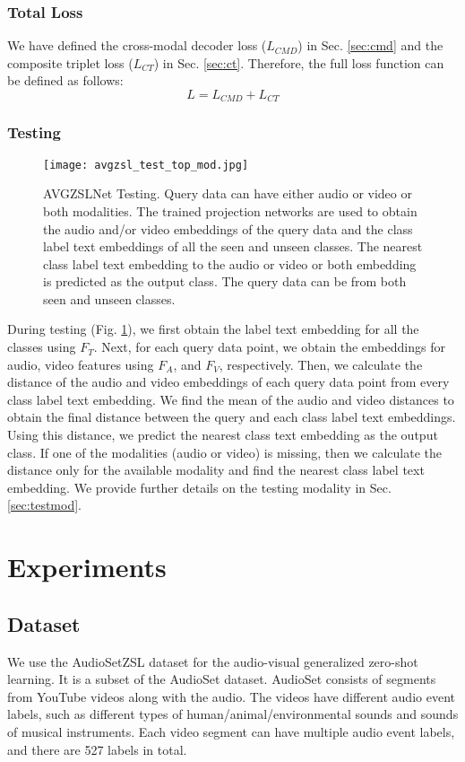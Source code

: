 \documentclass[10pt,twocolumn,letterpaper]{article}
\begin{document}
\subsubsection{Total Loss}
We have defined the cross-modal decoder loss ($L_{CMD}$) in Sec. \ref{sec:cmd} and the composite triplet loss ($L_{CT}$) in Sec. \ref{sec:ct}. Therefore, the full loss function can be defined as follows:
\begin{equation}\label{eq:full}
    L = L_{CMD} + L_{CT}
\end{equation}
\subsubsection{Testing}
\begin{figure}[t]
  \centering
  \texttt{[image: avgzsl\_test\_top\_mod.jpg]}
\caption{AVGZSLNet Testing. Query data can have either audio or video or both modalities. The trained projection networks are used to obtain the audio and/or video embeddings of the query data and the class label text embeddings of all the seen and unseen classes. The nearest class label text embedding to the audio or video or both embedding is predicted as the output class. The query data can be from both seen and unseen classes.}
\label{fig:test}
  \vspace{-10pt}
\end{figure}
During testing (Fig. \ref{fig:test}), we first obtain the label text embedding for all the classes using $F_T$. Next, for each query data point, we obtain the embeddings for audio, video features using $F_A$, and $F_V$, respectively. Then, we calculate the distance of the audio and video embeddings of each query data point from every class label text embedding. We find the mean of the audio and video distances to obtain the final distance between the query and each class label text embeddings. Using this distance, we predict the nearest class text embedding as the output class. If one of the modalities (audio or video) is missing, then we calculate the distance only for the available modality and find the nearest class label text embedding. We provide further details on the testing modality in Sec. \ref{sec:testmod}.


\section{Experiments}
\subsection{Dataset}
We use the AudioSetZSL dataset \cite{parida2020coordinated} for the audio-visual generalized zero-shot learning. It is a subset of the AudioSet \cite{gemmeke2017audio} dataset. AudioSet consists of segments from YouTube videos along with the audio. The videos have different audio event labels, such as different types of human/animal/environmental sounds and sounds of musical instruments. Each video segment can have multiple audio event labels, and there are 527 labels in total.
\end{document}
